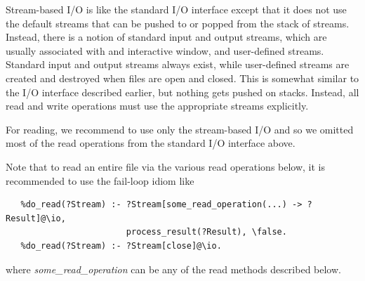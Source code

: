 \documentclass[11pt]{article}
\begin{document}
Stream-based I/O is like the standard I/O interface
except that it does not use the
default streams that can be pushed to or popped from the stack of streams.
Instead, there is a notion of standard input and output streams, which are
usually associated with and interactive window, and user-defined streams.
Standard input and output streams always exist, while user-defined streams
are created and destroyed when files are open and closed. This is somewhat 
similar to the I/O interface described earlier, but nothing gets pushed on
stacks. Instead,
all read and write operations must use the appropriate streams explicitly.

For reading, we recommend to use only the stream-based I/O and so we
omitted
most of the read operations from the standard I/O interface above.

Note that to read an entire file via the various read operations below, it
is recommended to use the fail-loop idiom like
\begin{verbatim}
   %do_read(?Stream) :- ?Stream[some_read_operation(...) -> ?Result]@\io,
                        process_result(?Result), \false.
   %do_read(?Stream) :- ?Stream[close]@\io.
\end{verbatim}
where \emph{some\_read\_operation}  can be any of the read methods
described below.
\end{document}

